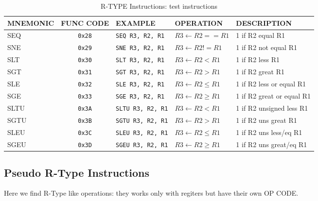 \begin{table}[H]
\begin{tabularx}{\textwidth}{|l|c|l|l|X|}
    \hline
    MNEMONIC & FUNC CODE & EXAMPLE & OPERATION & DESCRIPTION \\ 
    \hline
    SEQ & \texttt{0x28} & \texttt{SEQ R3, R2, R1} & $R3 \leftarrow R2 == R1$ & 1 if R2 equal R1\\ 
    \hline
    SNE & \texttt{0x29} & \texttt{SNE R3, R2, R1} & $R3 \leftarrow R2 != R1$ & 1 if R2 not equal R1\\ 
    \hline
    SLT & \texttt{0x30} & \texttt{SLT R3, R2, R1} & $R3 \leftarrow R2 < R1$ & 1 if R2 less R1\\ 
    \hline
    SGT & \texttt{0x31} & \texttt{SGT R3, R2, R1} & $R3 \leftarrow R2 > R1$ & 1 if R2 great R1\\ 
    \hline
    SLE & \texttt{0x32} & \texttt{SLE R3, R2, R1} & $R3 \leftarrow R2 \leq R1$ & 1 if R2 less or equal R1\\ 
    \hline
    SGE & \texttt{0x33} & \texttt{SGE R3, R2, R1} & $R3 \leftarrow R2 \geq R1$ & 1 if R2 great or equal R1\\ 
    \hline
    SLTU & \texttt{0x3A} & \texttt{SLTU R3, R2, R1} & $R3 \leftarrow R2 < R1$ & 1 if R2 unsigned less R1\\ 
    \hline
    SGTU & \texttt{0x3B} & \texttt{SGTU R3, R2, R1} & $R3 \leftarrow R2 > R1$ & 1 if R2 uns great R1\\ 
    \hline
    SLEU & \texttt{0x3C} & \texttt{SLEU R3, R2, R1} & $R3 \leftarrow R2 \leq R1$ & 1 if R2 uns less/eq R1\\ 
    \hline
    SGEU & \texttt{0x3D} & \texttt{SGEU R3, R2, R1} & $R3 \leftarrow R2 \geq R1$ & 1 if R2 uns great/eq R1\\ 
    \hline
\end{tabularx}
\caption{R-TYPE Instructions: test instructions}
\label{table:r_type_test}
\end{table}

\subsection{Pseudo R-Type Instructions}

Here we find R-Type like operations: they works only with regiters but have their own OP CODE.

